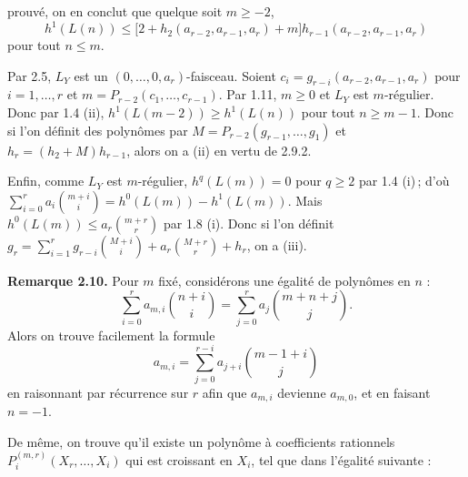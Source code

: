 prouvé, on en conclut que quelque soit \(m\ge -2\),
\[
h^1(L(n))\le
\bigl[2+h_2(a_{r-2},a_{r-1},a_r)+m\bigr]
h_{r-1}(a_{r-2},a_{r-1},a_r)
\tag{2.9.2}
\]
pour tout \(n\le m\).

Par 2.5, \(L_Y\) est un \((0,\ldots,0,a_r)\)-faisceau. Soient \(c_i=g_{r-i}(a_{r-2},a_{r-1},a_r)\) pour \(i=1,\ldots,r\) et \(m=P_{r-2}(c_1,\ldots,c_{r-1})\). Par 1.11, \(m\ge0\) et \(L_Y\) est \(m\)-régulier. Donc par 1.4 (ii), \(h^1(L(m-2))\ge h^1(L(n))\) pour tout \(n\ge m-1\). Donc si l'on définit des polynômes par \(M=P_{r-2}(g_{r-1},\ldots,g_1)\) et \(h_r=(h_2+M)h_{r-1}\), alors on a (ii) en vertu de 2.9.2.

Enfin, comme \(L_Y\) est \(m\)-régulier, \(h^q(L(m))=0\) pour \(q\ge2\) par 1.4 (i)\,; d'où \(\sum_{i=0}^{r}a_i\binom{m+i}{i}=h^0(L(m))-h^1(L(m))\). Mais \(h^0(L(m))\le a_r\binom{m+r}{r}\) par 1.8 (i). Donc si l'on définit \(g_r=\sum_{i=1}^{r}g_{r-i}\binom{M+i}{i}+a_r\binom{M+r}{r}+h_r\), on a (iii).

\textbf{Remarque 2.10.} Pour \(m\) fixé, considérons une égalité de polynômes en \(n\) :
\[
\sum_{i=0}^{r}a_{m,i}\binom{n+i}{i}
=
\sum_{j=0}^{r}a_j\binom{m+n+j}{j}.
\]
Alors on trouve facilement la formule
\[
a_{m,i}=\sum_{j=0}^{r-i}a_{j+i}\binom{m-1+i}{j}
\]
en raisonnant par récurrence sur \(r\) afin que \(a_{m,i}\) devienne \(a_{m,0}\), et en faisant \(n=-1\).

De même, on trouve qu'il existe un polynôme à coefficients rationnels \(P_i^{(m,r)}(X_r,\ldots,X_i)\) qui est croissant en \(X_i\), tel que dans l'égalité suivante :
